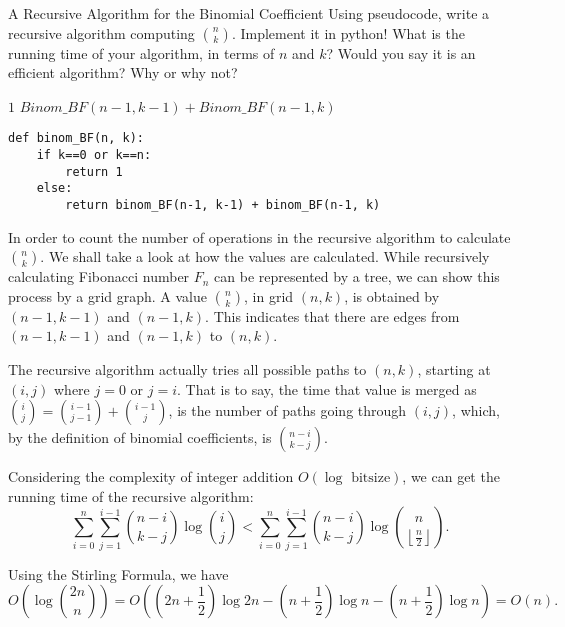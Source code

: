 \documentclass[UTF8, a4paper, linespread=1.5]{article}
\begin{document}
\newpage
\begin{thm}{A Recursive Algorithm for the Binomial Coefficient}{}
   Using pseudocode, write a recursive algorithm computing
  ${n \choose k}$. Implement it in python! What is 
  the running time of your algorithm, in terms of $n$ and $k$? Would you say it is an efficient
  algorithm? Why or why not?
\end{thm}

\begin{algorithm}
    \caption{Binom\_BF: A Recursive Algorithm for the Binomial Coefficient.}
    \begin{algorithmic}
        \RETURN $1$
        \ELSE
        \RETURN $Binom\_BF(n-1, k-1) + Binom\_BF(n-1, k)$
        \ENDIF
    \end{algorithmic}
\end{algorithm}

\begin{verbatim}
def binom_BF(n, k):
    if k==0 or k==n:
        return 1
    else:
        return binom_BF(n-1, k-1) + binom_BF(n-1, k)
\end{verbatim}

In order to count the number of operations in the recursive algorithm to calculate $\displaystyle \binom n k$. We shall take a look at how the values are calculated. While recursively calculating Fibonacci number $F_n$ can be represented by a tree, we can show this process by a grid graph. A value $\displaystyle \binom n k$, in grid $(n, k)$, is obtained by $(n-1, k-1)$ and $(n-1, k)$. This indicates that there are edges from $(n-1, k-1)$ and $(n-1, k)$ to $(n, k)$.

The recursive algorithm actually tries all possible paths to $(n, k)$, starting at $(i, j)$ where $j = 0$ or $j = i$. That is to say, the time that value is merged as $\displaystyle \binom i j = \binom {i-1}{j-1} + \binom {i-1} j$, is the number of paths going through $(i, j)$, which, by the definition of binomial coefficients, is $\displaystyle \binom {n-i}{k-j}$.

Considering the complexity of integer addition $O(\log \text{ bitsize})$, we can get the running time of the recursive algorithm: $$\sum_{i=0}^n\sum_{j=1}^{i-1} \binom {n-i}{k-j} \log  \binom i j < \sum_{i=0}^n\sum_{j=1}^{i-1} \binom {n-i}{k-j} \log  \binom n {\left\lfloor \frac{n}{2} \right\rfloor }.$$

Using the Stirling Formula, we have
$$O( \log \binom {2n} n) = O((2n+\frac{1}{2})\log 2n-(n+\frac{1}{2})\log n-(n+\frac{1}{2})\log n) = O(n).$$
\end{document}
